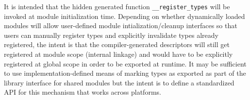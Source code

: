 It is intended that the hidden generated function \verb+__register_types+ will
be invoked at module initialization time. Depending on whether dynamically
loaded modules will allow user-defined module intialization/cleanup interfaces
so that users can manually register types and explicitly invalidate types
already registered, the intent is that the compiler-generated descriptors will
still get registered at module scope (internal linkage) and would have to be
explicitly registered at global scope in order to be exported at runtime. It may
be sufficient to use implementation-defined means of marking types as exported
as part of the library interface for shared modules but the intent is to define
a standardized API for this mechanism that works across platforms.

